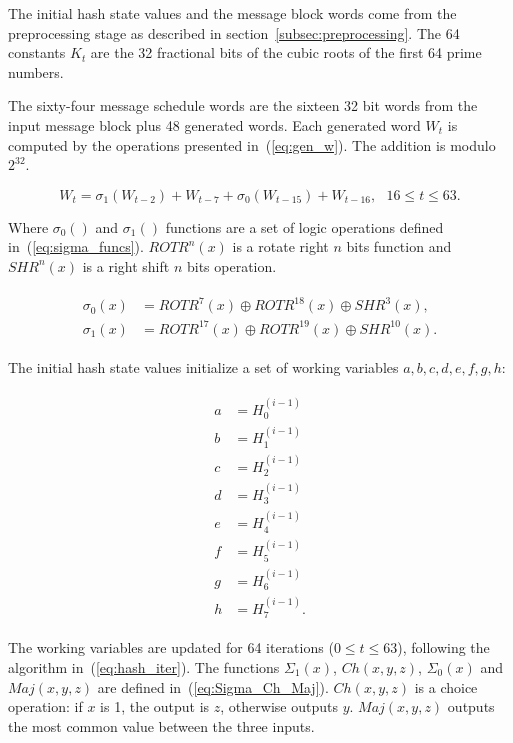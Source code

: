 The initial hash state values and the message block words come from the 
preprocessing stage as described in section~\ref{subsec:preprocessing}.
The 64 constants $K_{t}$ are the 32 fractional bits of the cubic roots of the
first 64 prime numbers.

The sixty-four message schedule words are the sixteen 32 bit words from the
input message block plus 48 generated words. Each generated word $W_{t}$ is
computed by the operations presented in~(\ref{eq:gen_w}). The addition is
modulo $2^{32}$.

\begin{equation}
    W_{t} = \sigma_{1}(W_{t-2}) + W_{t-7} + \sigma_{0}(W_{t-15}) + W_{t-16}, \ \ \ 16 \leq t \leq 63.
\label{eq:gen_w}
\end{equation}

Where $\sigma_{0}()$ and $\sigma_{1}()$ functions are a set of logic operations
defined in~(\ref{eq:sigma_funcs}). $ROTR^{n}(x)$ is a rotate right $n$ bits
function and $SHR^{n}(x)$ is a right shift $n$ bits operation.

\begin{align}
    \begin{split}
        \sigma_{0}(x) &= ROTR^{7}(x) \oplus ROTR^{18}(x) \oplus SHR^{3}(x), \\
        \sigma_{1}(x) &= ROTR^{17}(x) \oplus ROTR^{19}(x) \oplus SHR^{10}(x).
    \end{split}
\label{eq:sigma_funcs}
\end{align}

The initial hash state values initialize a set of working variables $a, b, c,
d, e, f, g, h$:

\begin{align}
    \begin{split}
        a &= H_{0}^{(i-1)} \\
        b &= H_{1}^{(i-1)} \\
        c &= H_{2}^{(i-1)} \\
        d &= H_{3}^{(i-1)} \\
        e &= H_{4}^{(i-1)} \\
        f &= H_{5}^{(i-1)} \\
        g &= H_{6}^{(i-1)} \\
        h &= H_{7}^{(i-1)}.
    \end{split}
\label{eq:init_state}
\end{align}

The working variables are updated for 64 iterations ($ 0 \leq t \leq 63$),
following the algorithm in~(\ref{eq:hash_iter}). The functions $\Sigma_1(x)$,
$Ch(x,y,z)$, $\Sigma_0(x)$ and $Maj(x,y,z)$ are defined
in~(\ref{eq:Sigma_Ch_Maj}). $Ch(x,y,z)$ is a choice operation: if $x$ is 1, the
output is $z$, otherwise outputs $y$. $Maj(x,y,z)$ outputs the most common
value between the three inputs.

